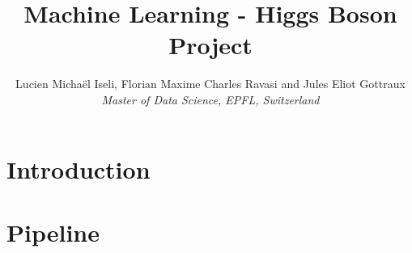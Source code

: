 \documentclass[10pt,conference,compsocconf]{IEEEtran}
\begin{document}
\title{Machine Learning - Higgs Boson Project}

\author{
  Lucien Michaël Iseli, Florian Maxime Charles Ravasi and Jules Eliot Gottraux\\
  \textit{Master of Data Science, EPFL, Switzerland}
}

\maketitle

\section{Introduction}

\section{Pipeline}
\end{document}
